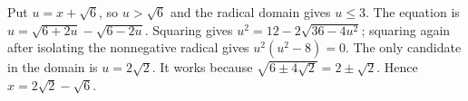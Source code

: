 Put $u=x+\sqrt6$, so $u>\sqrt6$ and the radical domain gives $u\le3$. The equation is $u=\sqrt{6+2u}-\sqrt{6-2u}$. Squaring gives $u^2=12-2\sqrt{36-4u^2}$; squaring again after isolating the nonnegative radical gives $u^2(u^2-8)=0$. The only candidate in the domain is $u=2\sqrt2$. It works because $\sqrt{6\pm4\sqrt2}=2\pm\sqrt2$. Hence $\boxed{x=2\sqrt2-\sqrt6}$.

